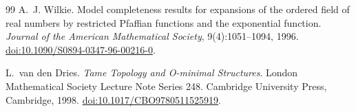 \documentclass[11pt]{article}
\theoremstyle{plain}
\theoremstyle{definition}
\theoremstyle{remark}
\begin{document}
\begin{thebibliography}{99}
A.~J. Wilkie.
\newblock Model completeness results for expansions of the ordered field of real numbers by restricted Pfaffian functions and the exponential function.
\newblock \emph{Journal of the American Mathematical Society}, 9(4):1051--1094, 1996.
\newblock \href{https://doi.org/10.1090/S0894-0347-96-00216-0}{doi:10.1090/S0894-0347-96-00216-0}.

L.~van den Dries.
\newblock \emph{Tame Topology and O-minimal Structures}.
\newblock London Mathematical Society Lecture Note Series 248. Cambridge University Press, Cambridge, 1998.
\newblock \href{https://doi.org/10.1017/CBO9780511525919}{doi:10.1017/CBO9780511525919}.

\end{thebibliography}
\end{document}
